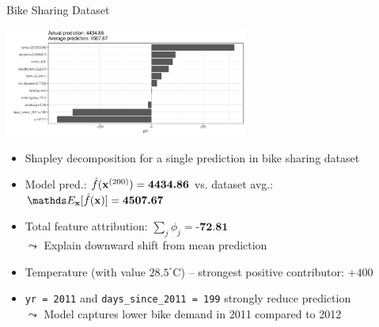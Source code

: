 \documentclass[10pt,compress,t,notes=noshow, xcolor=table]{beamer}
\begin{document}

\begin{frame}{Bike Sharing Dataset}

\begin{center}
\includegraphics[width=0.6\textwidth]{figure/shapley-bike.pdf}%
\end{center}

\begin{itemize}%
  \item Shapley decomposition for a single prediction in bike sharing dataset %
  \item Model pred.: $\hat{f}(\mathbf{x}^{(200)}) = \textbf{4434.86}$ vs. dataset avg.: $\E_\xv[\fh(\xv)] = \textbf{4507.67}$
  \item Total feature attribution: $\sum_j \phi_j = \textbf{-72.81}$\\
  $\leadsto$ Explain downward shift from mean prediction
  \item Temperature (with value $28.5^\circ$C) -- strongest positive contributor: $+400$
  \item \texttt{yr = 2011} and \texttt{days\_since\_2011 = 199} strongly reduce prediction\\
  $\leadsto$ Model captures lower bike demand in 2011 compared to 2012
\end{itemize}
\end{frame}
\end{document}
